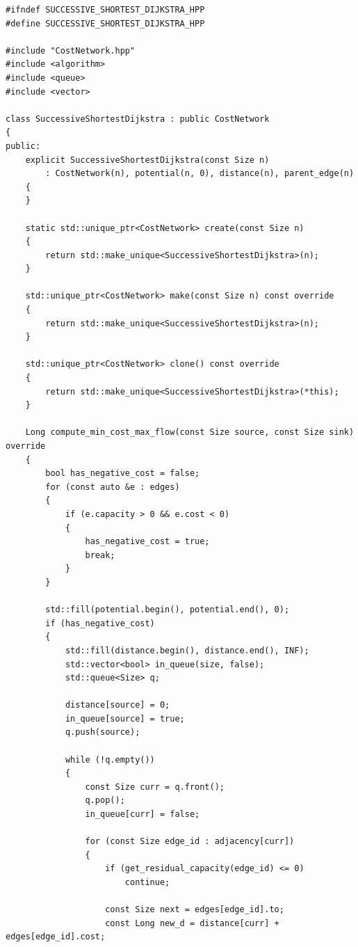 \newpage

\label{ap:successive_shortest_dijkstra}

\begin{lstlisting}[caption={Implementação em C++ do algoritmo \textit{Successive Shortest Path} com Potenciais Nodais e Dijkstra.}, label={lst:successive_shortest_dijkstra}]
#ifndef SUCCESSIVE_SHORTEST_DIJKSTRA_HPP
#define SUCCESSIVE_SHORTEST_DIJKSTRA_HPP

#include "CostNetwork.hpp"
#include <algorithm>
#include <queue>
#include <vector>

class SuccessiveShortestDijkstra : public CostNetwork
{
public:
	explicit SuccessiveShortestDijkstra(const Size n)
	    : CostNetwork(n), potential(n, 0), distance(n), parent_edge(n)
	{
	}

	static std::unique_ptr<CostNetwork> create(const Size n)
	{
		return std::make_unique<SuccessiveShortestDijkstra>(n);
	}

	std::unique_ptr<CostNetwork> make(const Size n) const override
	{
		return std::make_unique<SuccessiveShortestDijkstra>(n);
	}

	std::unique_ptr<CostNetwork> clone() const override
	{
		return std::make_unique<SuccessiveShortestDijkstra>(*this);
	}

	Long compute_min_cost_max_flow(const Size source, const Size sink) override
	{
		bool has_negative_cost = false;
		for (const auto &e : edges)
		{
			if (e.capacity > 0 && e.cost < 0)
			{
				has_negative_cost = true;
				break;
			}
		}

		std::fill(potential.begin(), potential.end(), 0);
		if (has_negative_cost)
		{
			std::fill(distance.begin(), distance.end(), INF);
			std::vector<bool> in_queue(size, false);
			std::queue<Size> q;

			distance[source] = 0;
			in_queue[source] = true;
			q.push(source);

			while (!q.empty())
			{
				const Size curr = q.front();
				q.pop();
				in_queue[curr] = false;

				for (const Size edge_id : adjacency[curr])
				{
					if (get_residual_capacity(edge_id) <= 0)
						continue;

					const Size next = edges[edge_id].to;
					const Long new_d = distance[curr] + edges[edge_id].cost;


\end{lstlisting}
